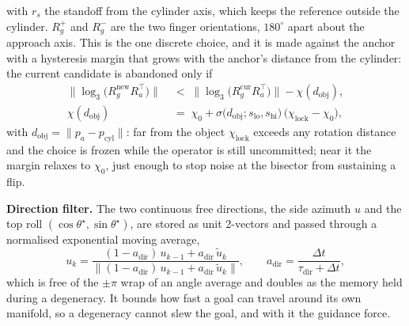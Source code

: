 with $r_s$ the standoff from the cylinder axis, which keeps the reference outside the cylinder. $R_g^{+}$ and $R_g^{-}$ are the two finger orientations, $180^{\circ}$ apart about the approach axis. This is the one discrete choice, and it is made against the anchor with a hysteresis margin that grows with the anchor's distance from the cylinder: the current candidate is abandoned only if
\begin{equation}
\begin{split}
\bigl\|\log_3\bigl(R_g^{\text{new}}R_a^{\top}\bigr)\bigr\| &\;<\; \bigl\|\log_3\bigl(R_g^{\text{cur}}R_a^{\top}\bigr)\bigr\| - \chi(d_{\text{obj}}),\\
\chi(d_{\text{obj}}) &\;=\; \chi_0 + \sigma\bigl(d_{\text{obj}}; s_{\text{lo}}, s_{\text{hi}}\bigr)\,\bigl(\chi_{\text{lock}} - \chi_0\bigr),
\end{split}
\label{eq:sidehyst}
\end{equation}
with $d_{\text{obj}} = \|p_a - p_{\text{cyl}}\|$: far from the object $\chi_{\text{lock}}$ exceeds any rotation distance and the choice is frozen while the operator is still uncommitted; near it the margin relaxes to $\chi_0$, just enough to stop noise at the bisector from sustaining a flip.

\textbf{Direction filter.} The two continuous free directions, the side azimuth $u$ and the top roll $(\cos\theta^{\star}, \sin\theta^{\star})$, are stored as unit 2-vectors and passed through a normalised exponential moving average,
\begin{equation}
u_k = \frac{(1 - a_{\text{dir}})\,u_{k-1} + a_{\text{dir}}\,\tilde{u}_k}{\bigl\|(1 - a_{\text{dir}})\,u_{k-1} + a_{\text{dir}}\,\tilde{u}_k\bigr\|},
\qquad a_{\text{dir}} = \frac{\Delta t}{\tau_{\text{dir}} + \Delta t},
\label{eq:dirfilter}
\end{equation}
which is free of the $\pm\pi$ wrap of an angle average and doubles as the memory held during a degeneracy. It bounds how fast a goal can travel around its own manifold, so a degeneracy cannot slew the goal, and with it the guidance force.

